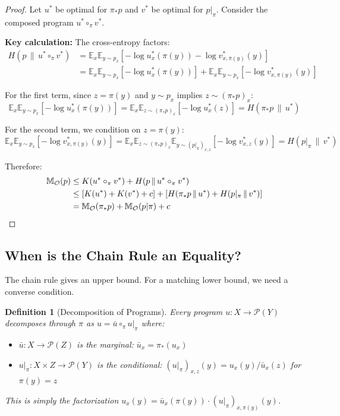 \documentclass[11pt]{article}
\newtheorem{definition}{Definition}
\begin{document}
\begin{proof}
Let $u^*$ be optimal for $\pi_* p$ and $v^*$ be optimal for $p|_\pi$. Consider the composed program $u^* \circ_\pi v^*$.

\textbf{Key calculation:} The cross-entropy factors:
\begin{align}
H(p \,\|\, u^* \circ_\pi v^*)
&= \mathbb{E}_{x} \mathbb{E}_{y \sim p_x}\left[-\log u^*_x(\pi(y)) - \log v^*_{x,\pi(y)}(y)\right] \\
&= \mathbb{E}_{x} \mathbb{E}_{y \sim p_x}\left[-\log u^*_x(\pi(y))\right] + \mathbb{E}_{x} \mathbb{E}_{y \sim p_x}\left[-\log v^*_{x,\pi(y)}(y)\right]
\end{align}

For the first term, since $z = \pi(y)$ and $y \sim p_x$ implies $z \sim (\pi_* p)_x$:
\[ \mathbb{E}_{x} \mathbb{E}_{y \sim p_x}\left[-\log u^*_x(\pi(y))\right] = \mathbb{E}_{x} \mathbb{E}_{z \sim (\pi_* p)_x}\left[-\log u^*_x(z)\right] = H(\pi_* p \,\|\, u^*) \]

For the second term, we condition on $z = \pi(y)$:
\[ \mathbb{E}_{x} \mathbb{E}_{y \sim p_x}\left[-\log v^*_{x,\pi(y)}(y)\right] = \mathbb{E}_{x} \mathbb{E}_{z \sim (\pi_* p)_x} \mathbb{E}_{y \sim (p|_\pi)_{x,z}}\left[-\log v^*_{x,z}(y)\right] = H(p|_\pi \,\|\, v^*) \]

Therefore:
\begin{align}
\mathbb{M}_\mathcal{O}(p) &\leq K(u^* \circ_\pi v^*) + H(p \,\|\, u^* \circ_\pi v^*) \\
&\leq [K(u^*) + K(v^*) + c] + [H(\pi_* p \,\|\, u^*) + H(p|_\pi \,\|\, v^*)] \\
&= \mathbb{M}_\mathcal{O}(\pi_* p) + \mathbb{M}_\mathcal{O}(p|\pi) + c \qedhere
\end{align}
\end{proof}

\subsection*{When is the Chain Rule an Equality?}

The chain rule gives an upper bound. For a matching lower bound, we need a converse condition.

\begin{definition}[Decomposition of Programs]
Every program $u: X \to \mathcal{P}(Y)$ decomposes through $\pi$ as $u = \bar{u} \circ_\pi u|_\pi$ where:
\begin{itemize}
    \item $\bar{u}: X \to \mathcal{P}(Z)$ is the marginal: $\bar{u}_x = \pi_* (u_x)$
    \item $u|_\pi: X \times Z \to \mathcal{P}(Y)$ is the conditional: $(u|_\pi)_{x,z}(y) = u_x(y) / \bar{u}_x(z)$ for $\pi(y) = z$
\end{itemize}
This is simply the factorization $u_x(y) = \bar{u}_x(\pi(y)) \cdot (u|_\pi)_{x,\pi(y)}(y)$.
\end{definition}
\end{document}
